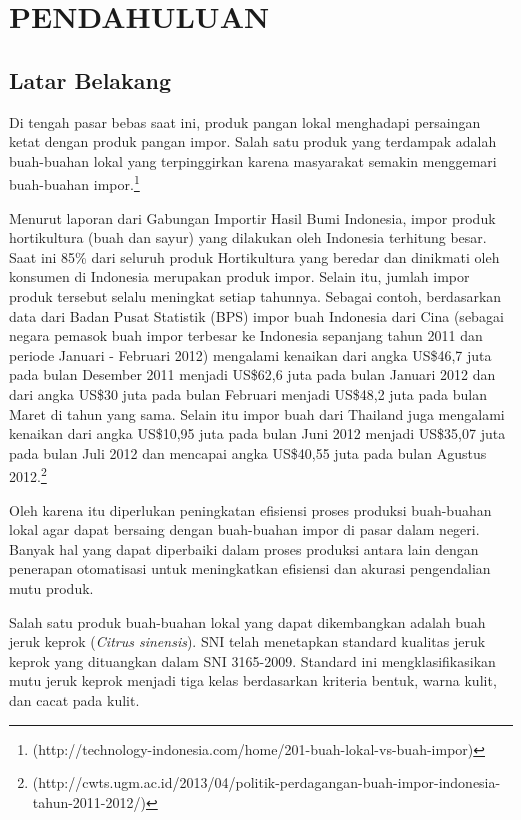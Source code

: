 \documentclass[laporan.tex]{subfiles}
\begin{document}
\chapter{PENDAHULUAN}

\section{Latar Belakang}

Di tengah pasar bebas saat ini, produk pangan lokal menghadapi persaingan ketat dengan produk pangan impor. Salah satu produk yang terdampak adalah buah-buahan lokal yang terpinggirkan karena masyarakat semakin menggemari buah-buahan impor.\footnote{(http://technology-indonesia.com/home/201-buah-lokal-vs-buah-impor)}

Menurut laporan dari Gabungan Importir Hasil Bumi Indonesia, impor produk hortikultura (buah dan sayur) yang dilakukan oleh Indonesia terhitung besar. Saat ini 85\% dari seluruh produk Hortikultura yang beredar dan dinikmati oleh konsumen di Indonesia merupakan produk impor. Selain itu, jumlah impor produk tersebut selalu meningkat setiap tahunnya. Sebagai contoh, berdasarkan data dari Badan Pusat Statistik (BPS) impor buah Indonesia dari Cina (sebagai negara pemasok buah impor terbesar ke Indonesia sepanjang tahun 2011 dan periode Januari - Februari 2012) mengalami kenaikan dari angka US\$46,7 juta pada bulan Desember 2011 menjadi US\$62,6 juta pada bulan Januari 2012 dan dari angka US\$30 juta pada bulan Februari menjadi US\$48,2 juta pada bulan Maret di tahun yang sama. Selain itu impor buah dari Thailand juga mengalami kenaikan dari angka US\$10,95 juta pada bulan Juni 2012 menjadi US\$35,07 juta pada bulan Juli 2012 dan mencapai angka US\$40,55 juta pada bulan Agustus 2012.\footnote{(http://cwts.ugm.ac.id/2013/04/politik-perdagangan-buah-impor-indonesia-tahun-2011-2012/)}

Oleh karena itu diperlukan peningkatan efisiensi proses produksi buah-buahan lokal agar dapat bersaing dengan buah-buahan impor di pasar dalam negeri. Banyak hal yang dapat diperbaiki dalam proses produksi antara lain dengan penerapan otomatisasi untuk meningkatkan efisiensi dan akurasi pengendalian mutu produk.

Salah satu produk buah-buahan lokal yang dapat dikembangkan adalah buah jeruk keprok (\emph{Citrus sinensis}). SNI telah menetapkan standard kualitas jeruk keprok yang dituangkan dalam SNI 3165-2009. Standard ini mengklasifikasikan mutu jeruk keprok menjadi tiga kelas berdasarkan kriteria  bentuk, warna kulit, dan cacat pada kulit.
\end{document}
